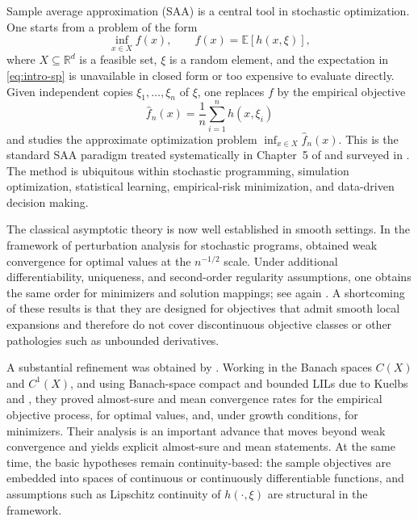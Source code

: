 \documentclass[11pt]{article}
\begin{document}
Sample average approximation (SAA) is a central tool in stochastic
optimization. One starts from a problem of the form 
\begin{equation}
\inf_{x\in X}f(x),\qquad f(x)=\mathbb{E}[h(x,\xi)],\label{eq:intro-sp}
\end{equation}
where $X\subseteq\mathbb{R}^{d}$ is a feasible set, $\xi$ is a random
element, and the expectation in \eqref{eq:intro-sp} is unavailable
in closed form or too expensive to evaluate directly. Given independent
copies $\xi_{1},\dots,\xi_{n}$ of $\xi$, one replaces $f$ by the
empirical objective 
\begin{equation}
\hat{f}_{n}(x)=\frac{1}{n}\sum_{i=1}^{n}h(x,\xi_{i})\label{eq:intro-saa}
\end{equation}
and studies the approximate optimization problem $\inf_{x\in X}\hat{f}_{n}(x)$.
This is the standard SAA paradigm treated systematically in Chapter~5
of \citet{ShapiroDentchevaRuszczynski2021} and surveyed in \citet{KimPasupathyHenderson2015}.
The method is ubiquitous within stochastic programming, simulation
optimization, statistical learning, empirical-risk minimization, and
data-driven decision making.

The classical asymptotic theory is now well established in smooth
settings. In the framework of perturbation analysis for stochastic
programs, \citet{Shapiro1991} obtained weak convergence for optimal
values at the $n^{-1/2}$ scale. Under additional differentiability,
uniqueness, and second-order regularity assumptions, one obtains the
same order for minimizers and solution mappings; see again \citet[Chapter~5]{ShapiroDentchevaRuszczynski2021}.
A shortcoming of these results is that they are designed for objectives
that admit smooth local expansions and therefore do not cover discontinuous
objective classes or other pathologies such as unbounded derivatives.

A substantial refinement was obtained by \citet{Banholzer2022}.
Working in the Banach spaces $C(X)$ and $C^{1}(X)$, and using Banach-space
compact and bounded LILs due to Kuelbs \citep[Theorem~4.4]{Kuelbs1976}
and \citet[Theorem~4.1]{Kuelbs1977}, they proved almost-sure and
mean convergence rates for the empirical objective process, for optimal
values, and, under growth conditions, for minimizers. Their analysis
is an important advance that moves beyond weak convergence and yields
explicit almost-sure and mean statements. At the same time, the basic
hypotheses remain continuity-based: the sample objectives are embedded
into spaces of continuous or continuously differentiable functions,
and assumptions such as Lipschitz continuity of $h(\cdot,\xi)$ are
structural in the framework.
\end{document}
